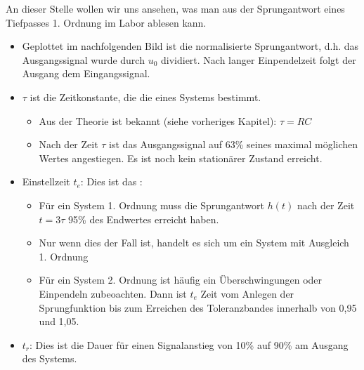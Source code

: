 \documentclass[letterpaper,10pt,english]{jupyterBook}
\begin{document}
\sphinxAtStartPar
An dieser Stelle wollen wir uns ansehen, was man aus der Sprungantwort eines Tiefpasses 1. Ordnung im Labor ablesen kann.
\begin{itemize}
\item {} 
\sphinxAtStartPar
Geplottet im nachfolgenden Bild ist die normalisierte Sprungantwort, d.h. das Ausgangssignal wurde durch \(u_0\) dividiert. Nach langer Einpendelzeit folgt der Ausgang dem Eingangssignal.

\item {} 
\sphinxAtStartPar
\(\tau\) ist die Zeitkonstante, die die  eines Systems bestimmt.
\begin{itemize}
\item {} 
\sphinxAtStartPar
Aus der Theorie ist bekannt (siehe vorheriges Kapitel): \(\tau = RC\)

\item {} 
\sphinxAtStartPar
Nach der Zeit \(\tau\) ist das Ausgangssignal auf 63\% seines maximal möglichen Wertes angestiegen. Es ist noch kein stationärer Zustand erreicht.

\end{itemize}

\item {} 
\sphinxAtStartPar
Einstellzeit \(t_e\): Dies ist das :
\begin{itemize}
\item {} 
\sphinxAtStartPar
Für ein System 1. Ordnung muss die Sprungantwort \(h(t)\) nach der Zeit \(t = 3\tau\) 95\% des Endwertes erreicht haben.

\item {} 
\sphinxAtStartPar
Nur wenn dies der Fall ist, handelt es sich um ein System mit Ausgleich 1. Ordnung

\item {} 
\sphinxAtStartPar
Für ein System 2. Ordnung ist häufig ein Überschwingungen oder Einpendeln zubeoachten. Dann ist \(t_e\) Zeit vom Anlegen der Sprungfunktion bis zum Erreichen des Toleranzbandes innerhalb von 0,95 und 1,05.

\end{itemize}

\item {} 
\sphinxAtStartPar
{} \(t_r\): Dies ist die Dauer für einen Signalanstieg von 10\% auf 90\% am Ausgang des Systems.

\end{itemize}
\end{document}
